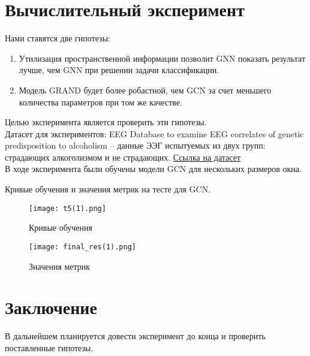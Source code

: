 \documentclass{article}
\begin{document}
\section{Вычислительный эксперимент}
Нами ставятся две гипотезы:
\begin{enumerate}
    \item Утилизация пространственной информации позволит GNN показать результат лучше, чем GNN при решении задачи классификации.
    \item Модель GRAND будет более робастной, чем GCN за счет меньшего количества параметров при том же качестве.
\end{enumerate}
Целью эксперимента является проверить эти гипотезы. \\
Датасет для экспериментов: EEG Database to examine EEG correlates of genetic
predisposition to alcoholism -- данные ЭЭГ испытуемых из двух групп: страдающих алкоголизмом и не страдающих. \href{https://archive.ics.uci.edu/dataset/121/eeg+database}{Ссылка на датасет}
\\
В ходе эксперимента были обучены модели GCN для нескольких размеров окна.
\newpage
\begin{flushleft}
Кривые обучения и значения метрик на тесте для GCN.
\end{flushleft}
\begin{figure}[!h]
\begin{minipage}{.475\textwidth} 
    \texttt{[image: t5(1).png]}
 	\caption{Кривые обучения}
\end{minipage}
\begin{minipage}{.475\textwidth}
    \texttt{[image: final\_res(1).png]}
 	\caption{Значения метрик}
\end{minipage}
\end{figure}

\section{Заключение}
В дальнейшем планируется довести эксперимент до конца и проверить поставленные гипотезы.




\end{document}
